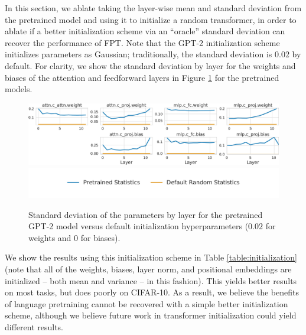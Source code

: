 In this section, we ablate taking the layer-wise mean and standard deviation from the pretrained model and using it to initialize a random transformer, in order to ablate if a better initialization scheme via an ``oracle'' standard deviation can recover the performance of FPT.
Note that the GPT-2 initialization scheme initializes parameters as Gaussian; traditionally, the standard deviation is $0.02$ by default.
For clarity, we show the standard deviation by layer for the weights and biases of the attention and feedforward layers in Figure \ref{fig:statistics} for the pretrained models.

\begin{figure}[H]
    \centering
    \includegraphics[width=1\linewidth]{figures/statistics/statistics.pdf}
    \vspace{1em}
    \includegraphics[width=0.6\linewidth]{figures/statistics/stats_legend.pdf}
    \caption{
        Standard deviation of the parameters by layer for the pretrained GPT-2 model versus default initialization hyperparameters ($0.02$ for weights and $0$ for biases).
    }
    \label{fig:statistics}
\end{figure}

\vspace{-1em}

We show the results using this initialization scheme in Table \ref{table:initialization} (note that all of the weights, biases, layer norm, and positional embeddings are initialized -- both mean and variance -- in this fashion).
This yields better results on most tasks, but does poorly on CIFAR-10.
As a result, we believe the benefits of language pretraining cannot be recovered with a simple better initialization scheme, although we believe future work in transformer initialization could yield different results.

